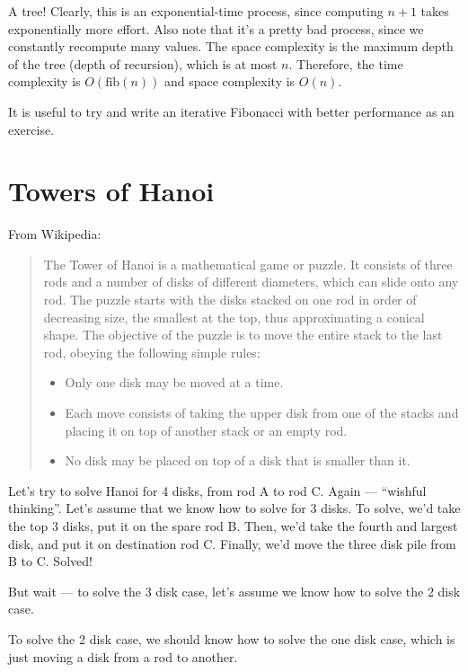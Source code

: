\documentclass[9pt]{report}
\begin{document}
A tree! Clearly, this is an exponential-time process, since
computing \(n+1\) takes exponentially more effort. Also note that
it's a pretty bad process, since we constantly recompute many
values. The space complexity is the maximum depth of the tree
(depth of recursion), which is at most \(n\). Therefore, the time
complexity is \(O(\mathrm{fib}(n))\) and space complexity is \(O(n)\).

It is useful to try and write an iterative Fibonacci with better
performance as an exercise.

\section{Towers of Hanoi}
\label{sec:orgb442b14}

From Wikipedia:

\begin{quote}
The Tower of Hanoi is a mathematical game or puzzle. It consists of
three rods and a number of disks of different diameters, which can
slide onto any rod. The puzzle starts with the disks stacked on one
rod in order of decreasing size, the smallest at the top, thus
approximating a conical shape. The objective of the puzzle is to
move the entire stack to the last rod, obeying the following simple
rules:

\begin{itemize}
\item Only one disk may be moved at a time.
\item Each move consists of taking the upper disk from one of the
stacks and placing it on top of another stack or an empty rod.
\item No disk may be placed on top of a disk that is smaller than it.
\end{itemize}
\end{quote}

Let's try to solve Hanoi for 4 disks, from rod A to rod C. Again
--- ``wishful thinking''. Let's assume that we know how to solve for
3 disks. To solve, we'd take the top 3 disks, put it on the spare
rod B. Then, we'd take the fourth and largest disk, and put it on
destination rod C. Finally, we'd move the three disk pile from B
to C. Solved!

But wait --- to solve the 3 disk case, let's assume we know how to
solve the 2 disk case.

To solve the 2 disk case, we should know how
to solve the one disk case, which is just moving a disk from a rod
to another.
\end{document}
